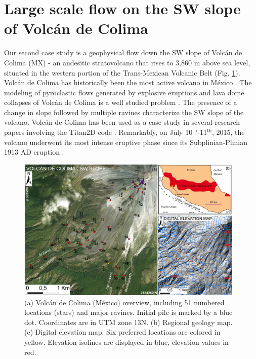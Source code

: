 \documentclass{article}
\begin{document}
\section{Large scale flow on the SW slope of Volc{\'a}n de Colima}\label{QoI2}
Our second case study is a geophysical flow down the SW slope of Volc{\'a}n de Colima (MX) - an andesitic stratovolcano that rises to 3,860 m above sea level, situated in the western portion of the Trans-Mexican Volcanic Belt (Fig. \ref{fig:Colima-first}). Volc{\'a}n de Colima has historically been the most active volcano in M{\'e}xico \citep{DeLaCruzReina1993, Zobin2002, Gonzalez2002}. The modeling of pyroclastic flows generated by explosive eruptions and lava dome collapses of Volc{\'a}n de Colima is a well studied problem \citep{DelPozzo1995,Sheridan1995,Saucedo2002,Saucedo2004,Saucedo2005,Sarocchi2011,Capra2015}. The presence of a change in slope followed by multiple ravines characterize the SW slope of the volcano. Volc{\'a}n de Colima has been used as a case study in several research papers involving the Titan2D code \citep{Rupp2004, Rupp2006, Dalbey2008, Yu2009, Sulpizio2010, Capra2011, Aghakhani2016}. Remarkably, on July 10$^{\mathrm{th}}$-11$^{\mathrm{th}}$, 2015, the volcano underwent its most intense eruptive phase since its Subplinian-Plinian 1913 AD eruption \citep{Saucedo2010, Zobin2015, ReyesDaVilla2016, Capra2016, Macorps2018}.
\begin{figure}[H]
    \includegraphics[width=0.97\textwidth]{figures/Colima/ColimaFig.jpg}
    \centering
    \caption{(a) Volc{\'a}n de Colima (M{\'e}xico) overview, including 51 numbered locations (stars) and major ravines. Initial pile is marked by a blue dot. Coordinates are in UTM zone 13N. (b) Regional geology map. (c) Digital elevation map. Six preferred locations are colored in yellow. Elevation isolines are displayed in blue, elevation values in red.}
    \label{fig:Colima-first}
\end{figure}
\end{document}
